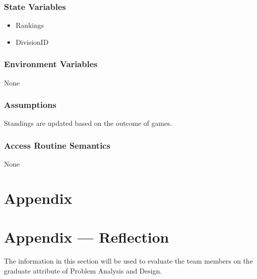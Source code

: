 \documentclass[12pt, titlepage]{article}
\begin{document}
\subsubsection{State Variables} 
\begin{itemize} 
  \item Rankings
  \item DivisionID 
\end{itemize}

\subsubsection{Environment Variables}

None

\subsubsection{Assumptions}

Standings are updated based on the outcome of games.

\subsubsection{Access Routine Semantics}

None

\section{Appendix} \label{Appendix}


\newpage{}

\section*{Appendix --- Reflection}


The information in this section will be used to evaluate the team members on the
graduate attribute of Problem Analysis and Design.


\end{document}
